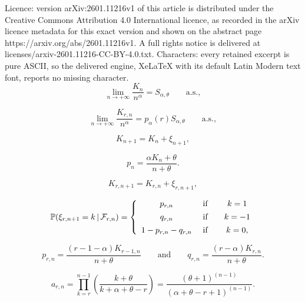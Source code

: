 \documentclass[10pt,a4paper]{amsart}
\newcommand{\dP}{\mathbb{P}}
\begin{document}
Licence: version arXiv:2601.11216v1 of this article is distributed under the Creative Commons Attribution 4.0 International licence, as recorded in the arXiv licence metadata for this exact version and shown on the abstract page https://arxiv.org/abs/2601.11216v1. A full rights notice is delivered at licenses/arxiv-2601.11216-CC-BY-4.0.txt. Characters: every retained excerpt is pure ASCII, so the delivered engine, XeLaTeX with its default Latin Modern text font, reports no missing character.
\begin{equation}\label{eq:kalpha}
\lim_{n\rightarrow+\infty}\frac{K_{n}}{n^{\alpha}}=S_{\alpha,\theta}\qquad\text{a.s.},
\end{equation}

\begin{equation}\label{eq:kralpha}
\lim_{n\rightarrow+\infty}\frac{K_{r,n}}{n^{\alpha}}=p_{\alpha}(r) S_{\alpha,\theta}\qquad\text{a.s.},
\end{equation}

\begin{equation}\label{DEFK}
K_{n+1} = K_n + \xi_{n+1},
\end{equation}

\begin{equation}
\label{DEFPN}
p_n=\frac{\alpha K_n+ \theta}{n+\theta}.
\end{equation} 

\begin{equation}\label{DEFKr}
K_{r,n+1}=K_{r,n}+\xi_{r,n+1},
\end{equation}

\begin{equation}
\label{DEFXIKr}
   \dP(\xi_{r,n+1}=k\,|\,\mathcal{F}_{r,n})=\left \{ \begin{array}{ccc}
    {p_{r,n}}  & \text{ if } & \ \ k=1 \vspace{1ex}\\
    {q_{r,n}}  & \text{ if } & \ \ k=-1 \vspace{1ex}\\
     {1-p_{r,n}-q_{r,n}} & \text{ if }  & \ \ k=0,
   \end{array}  \right.
\end{equation}

\begin{equation}
\label{DEFIPr}
p_{r,n}=\frac{(r-1-\alpha)K_{r-1,n}}{n+\theta}\qquad \text{and}\qquad q_{r,n}=\frac{(r-\alpha)K_{r,n}}{n+\theta}.
\end{equation}

\begin{equation}
\label{DEFAr}
a_{r,n}=\prod_{k=r}^{n-1}\left(\frac{k+\theta}{k+\alpha+\theta-r}\right)=\frac{(\theta+1)^{(n-1)}}{(\alpha+\theta-r+1)^{(n-1)}}.
\end{equation}
\end{document}
